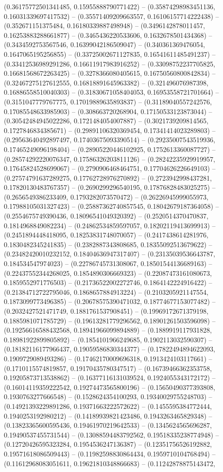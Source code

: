 (0.36175772501341485, 0.15955888790771422) -- (0.35874298983451136, 0.16031339697417532) -- (0.35571409209663557, 0.16106157714222438) -- (0.352671151375484, 0.16180339887498948) -- (0.3496142878011457, 0.16253883288661877) -- (0.3465436220533606, 0.1632678501434368) -- (0.3434592753567546, 0.16399042186509047) -- (0.340361369476054, 0.1647065195256855) -- (0.33725002671127835, 0.16541611485491237) -- (0.33412536989291286, 0.16611917983916252) -- (0.33098752237705825, 0.16681568672263425) -- (0.3278366080405615, 0.16750560800842834) -- (0.32467275127612555, 0.16818891645963382) -- (0.321496076987398, 0.16886558510040303) -- (0.31830671058404053, 0.16953558721701664) -- (0.3151047779767775, 0.17019889635893837) -- (0.31189040557242576, 0.17085548633985903) -- (0.308663720268904, 0.17150533123873044) -- (0.30542484945022286, 0.1721484054007887) -- (0.3021739209814565, 0.1727846834385671) -- (0.29891106320369454, 0.17341414023289803) -- (0.29563640492897497, 0.17403675093390514) -- (0.29235007543519936, 0.17465249096198404) -- (0.28905220446102925, 0.1752613360087727) -- (0.28574292220076347, 0.17586326203811126) -- (0.28242235929919957, 0.17645824528699067) -- (0.2790906468464751, 0.17704626226649103) -- (0.27574791637289275, 0.17762728976270892) -- (0.2723942998437281, 0.17820130483767357) -- (0.2690299296540195, 0.17876828483025275) -- (0.2656549386233409, 0.1793282073570472) -- (0.26226945999055973, 0.17988105031327423) -- (0.25887362740857545, 0.18042679187364058) -- (0.2554675749390436, 0.18096541049320392) -- (0.2520514370470837, 0.1814968849082234) -- (0.24862534859597057, 0.18202119413699913) -- (0.2451894448418095, 0.18253831748070057) -- (0.2417438614281976, 0.1830482345241835) -- (0.2382887343808685, 0.18355092513679622) -- (0.23482420010232152, 0.18404636947317407) -- (0.23135039536643787, 0.184534547974023) -- (0.22786745731308067, 0.18501544136689163) -- (0.22437552344268025, 0.1854890306669323) -- (0.22087473161080673, 0.1859552971776503) -- (0.21736522002272746, 0.1864142224916422) -- (0.21384712722795046, 0.1868657884913224) -- (0.2103205921147554, 0.1873099773496385) -- (0.20678575390471032, 0.18774677153077482) -- (0.2032427521471749, 0.1881761537908451) -- (0.19969172671379198, 0.1885981071785729) -- (0.19613281779296562, 0.18901261503596098) -- (0.19256616588432568, 0.18941966099894889) -- (0.1889919117931828, 0.18981922899805892) -- (0.1854101966249685, 0.1902113032590307) -- (0.18182116177966437, 0.19059586830344377) -- (0.17822494894622093, 0.1909729089493286) -- (0.17462170009696318, 0.1913424103117661) -- (0.1710115574819857, 0.19170435780347517) -- (0.16739466362353758, 0.19205873713538862) -- (0.16377116131039524, 0.1924055343172172) -- (0.16014119359222542, 0.19274473565800196) -- (0.15650490377393808, 0.1930763277666548) -- (0.1528624354100293, 0.19340029755248703) -- (0.14921393229891286, 0.19371663222572622) -- (0.1455595384772444, 0.1940253192980212) -- (0.14189939821423486, 0.1943263465829348) -- (0.13823365600595436, 0.19461970219642533) -- (0.1345624565696287, 0.19490537455731544) -- (0.13088594483792562, 0.19518335238774948) -- (0.12720426595323284, 0.1954536247136387) -- (0.12351756526192882, 0.19571618086509443) -- (0.11982598830864434, 0.1959710104768494) -- (0.11612968083051611, 0.19621810348866683) -- (0.11242878875143472, 